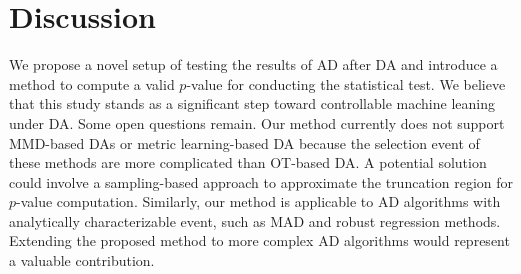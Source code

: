 \vspace{-5pt}

\section{Discussion} \label{sec:discussion}

\vspace{-5pt}
We propose a novel setup of testing the results of AD after DA and introduce a method to compute a valid $p$-value for conducting the statistical test.
%
We believe that this study stands as a significant step toward controllable machine leaning under DA. 
%
Some open questions remain. 
%
Our method currently does not support MMD-based DAs \cite{gong2013connecting, pan2010domain, baktashmotlagh2013unsupervised} or metric learning-based DA \cite{saenko2010adapting} because the selection event of these methods are more complicated than OT-based DA.
%
A potential solution could involve a sampling-based approach to approximate the truncation region for $p$-value computation.
%
Similarly, our method is applicable to AD algorithms with analytically characterizable event, such as MAD and  robust regression methods. 
%
Extending the proposed method to more complex AD algorithms would represent a valuable contribution.

